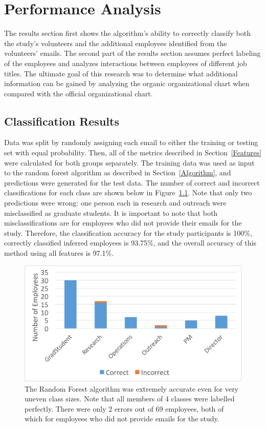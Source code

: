 \documentclass[12pt]{report}
\begin{document}
\chapter{Performance Analysis} \label{Performance}
The results section first shows the algorithm's ability to correctly classify both the study's volunteers and the additional employees identified from the volunteers' emails.
The second part of the results section assumes perfect labeling of the employees and analyzes interactions between employees of different job titles.
The ultimate goal of this research was to determine what additional information can be gained by analyzing the organic organizational chart when compared with the official organizational chart.

\section{Classification Results}
Data was split by randomly assigning each email to either the training or testing set with equal probability.
Then, all of the metrics described in Section~\ref{Features} were calculated for both groups separately.
The training data was used as input to the random forest algorithm as described in Section~\ref{Algorithm}, and predictions were generated for the test data.
The number of correct and incorrect classifications for each class are shown below in Figure~\ref{fig:result_hist}.
Note that only two predictions were wrong: one person each in research and outreach were misclassified as graduate students.
It is important to note that both  misclassifications are for employees who did not provide their emails for the study.
Therefore, the classification accuracy for the study participants is 100\%, correctly classified inferred employees is 93.75\%, and the overall accuracy of this method using all features is 97.1\%.

\begin{figure}[t]
    \centering
    \includegraphics[width=\columnwidth,trim={1mm 2mm 1mm 3mm},clip]{Prediction_50_50_RF}
    \vspace{-20pt}
    \caption{The Random Forest algorithm was extremely accurate even for very uneven class sizes.  Note that all members of 4 classes were labelled perfectly.  There were only 2 errors out of 69 employees, both of which for employees who did not provide emails for the study.}
    \label{fig:result_hist}
\end{figure}
\end{document}

